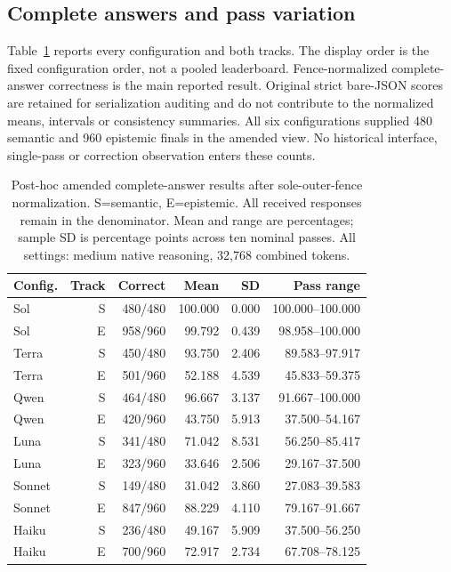 \documentclass[a4paper,preprint,12pt,numbers,nopreprintline]{elsarticle}
\begin{document}
\subsection{Complete answers and pass variation}
Table~\ref{tab:ten-pass-summary} reports every configuration and both tracks. The display order is the fixed configuration order, not a pooled leaderboard. Fence-normalized complete-answer correctness is the main reported result. Original strict bare-JSON scores are retained for serialization auditing and do not contribute to the normalized means, intervals or consistency summaries. All six configurations supplied 480 semantic and 960 epistemic finals in the amended view. No historical interface, single-pass or correction observation enters these counts.
\begin{table}[htbp]\centering\scriptsize
\caption{Post-hoc amended complete-answer results after sole-outer-fence normalization. S=semantic, E=epistemic. All received responses remain in the denominator. Mean and range are percentages; sample SD is percentage points across ten nominal passes. All settings: medium native reasoning, 32,768 combined tokens.}\label{tab:ten-pass-summary}
\setlength{\tabcolsep}{3pt}
\begin{tabular}{lrrrrr}\toprule
Config. & Track & Correct & Mean & SD & Pass range\\\midrule
Sol & S & 480/480 & 100.000 & 0.000 & 100.000--100.000\\
Sol & E & 958/960 & 99.792 & 0.439 & 98.958--100.000\\
Terra & S & 450/480 & 93.750 & 2.406 & 89.583--97.917\\
Terra & E & 501/960 & 52.188 & 4.539 & 45.833--59.375\\
Qwen & S & 464/480 & 96.667 & 3.137 & 91.667--100.000\\
Qwen & E & 420/960 & 43.750 & 5.913 & 37.500--54.167\\
Luna & S & 341/480 & 71.042 & 8.531 & 56.250--85.417\\
Luna & E & 323/960 & 33.646 & 2.506 & 29.167--37.500\\
Sonnet & S & 149/480 & 31.042 & 3.860 & 27.083--39.583\\
Sonnet & E & 847/960 & 88.229 & 4.110 & 79.167--91.667\\
Haiku & S & 236/480 & 49.167 & 5.909 & 37.500--56.250\\
Haiku & E & 700/960 & 72.917 & 2.734 & 67.708--78.125\\
\bottomrule\end{tabular}
\end{table}
\end{document}
